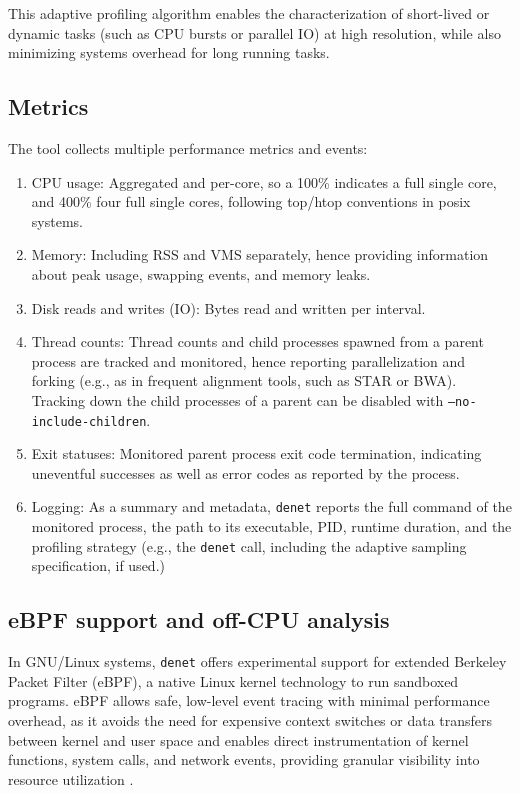 \documentclass[10pt]{article}
\begin{document}
This adaptive profiling algorithm enables the characterization of short-lived or dynamic tasks (such as CPU bursts or parallel IO) at high resolution, while also minimizing systems overhead for long running tasks.

\subsection*{Metrics}

The tool collects multiple performance metrics and events:

\begin{enumerate}[itemsep=1pt, topsep=1pt]
    \item CPU usage: Aggregated and per-core, so a 100\% indicates a full single core, and 400\% four full single cores, following top/htop conventions in posix systems.
    \item Memory: Including RSS and VMS separately, hence providing information about peak usage, swapping events, and memory leaks.
    \item Disk reads and writes (IO): Bytes read and written per interval.
    \item Thread counts: Thread counts and child processes spawned from a parent process are tracked and monitored, hence reporting parallelization and forking (e.g., as in frequent alignment tools, such as STAR or BWA). Tracking down the child processes of a parent can be disabled with \texttt{--no-include-children}. 
    \item Exit statuses: Monitored parent process exit code termination, indicating uneventful successes as well as error codes as reported by the process.
    \item Logging: As a summary and metadata, \texttt{denet} reports the full command of the monitored process, the path to its executable, PID, runtime duration, and the profiling strategy (e.g., the \texttt{denet} call, including the adaptive sampling specification, if used.)
\end{enumerate}

\subsection*{eBPF support and off-CPU analysis}

In GNU/Linux systems, \texttt{denet} offers experimental support for extended Berkeley Packet Filter (eBPF), a native Linux kernel technology to run sandboxed programs. eBPF allows safe, low-level event tracing with minimal performance overhead, as it avoids the need for expensive context switches or data transfers between kernel and user space and enables direct instrumentation of kernel functions, system calls, and network events, providing granular visibility into resource utilization \cite{gregg2019bpf,gbadamosi2024ebpf}. 
\end{document}
